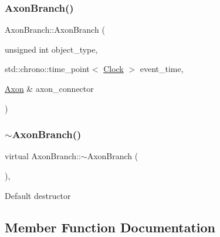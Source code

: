 \mbox{\label{classAxonBranch_a98f33462edf82dacab750d1140172912}} 
\subsubsection{\texorpdfstring{Axon\+Branch()}{AxonBranch()}\hspace{0.1cm}{\footnotesize\ttfamily [4/4]}}
{\footnotesize\ttfamily Axon\+Branch\+::\+Axon\+Branch (\begin{DoxyParamCaption}\item[{unsigned int}]{object\+\_\+type,  }\item[{std\+::chrono\+::time\+\_\+point$<$ \mbox{\hyperlink{universe_8h_a0ef8d951d1ca5ab3cfaf7ab4c7a6fd80}{Clock}} $>$}]{event\+\_\+time,  }\item[{\mbox{\hyperlink{classAxon}{Axon}} \&}]{axon\+\_\+connector }\end{DoxyParamCaption})\hspace{0.3cm}{\ttfamily [inline]}}

\mbox{\label{classAxonBranch_ae4ef4c954b43d084cafb30cf900a1728}} 
\subsubsection{\texorpdfstring{$\sim$\+Axon\+Branch()}{~AxonBranch()}}
{\footnotesize\ttfamily virtual Axon\+Branch\+::$\sim$\+Axon\+Branch (\begin{DoxyParamCaption}{ }\end{DoxyParamCaption})\hspace{0.3cm}{\ttfamily [inline]}, {\ttfamily [virtual]}}

Default destructor 

\subsection{Member Function Documentation}
\mbox{\label{classAxonBranch_a88e6af84b45bb6f6f8900a6d4aec446c}} 
